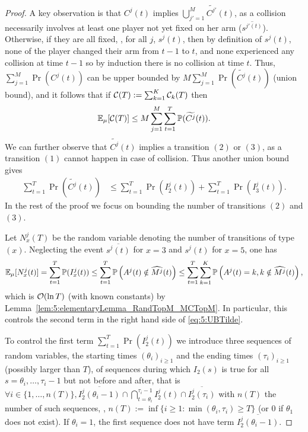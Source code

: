 \begin{proof}
  A key observation is that $C^j(t)$ implies $\bigcup_{j'=1}^M \widetilde{C^{j'}}(t)$, as a collision necessarily involves at least one player not yet fixed on her arm ($\overline{s^{j'(t)}}$).
  Otherwise, if they are all fixed, \ie, for all $j$, $s^j(t)$, then by definition of $s^j(t)$, none of the player changed their arm from $t-1$ to $t$, and none experienced any collision at time $t-1$ so by induction there is no collision at time $t$.
  Thus, $\sum_{j=1}^M \Pr(C^j(t))$ can be upper bounded by $M \sum_{j=1}^M \Pr(\widetilde{C^j}(t))$ (union bound),
  and it follows that if $\mathcal{C}(T) := \sum_{k=1}^K \mathcal{C}_k(T)$ then
  \[\mathbb{E}_{\mu}[\mathcal{C}(T)] \leq M \sum_{j=1}^M \sum_{t=1}^T \mathbb{P}(\widetilde{C^j}(t)).\]
  We can further  observe that $\widetilde{C^j}(t)$ implies a transition $(2)$ or $(3)$, as a transition $(1)$ cannot happen in case of collision. Thus another union bound gives
  \begin{align}
    \sum_{t=1}^T \Pr(\widetilde{C^j}(t))
    &\leq \sum_{t=1}^T \Pr(I_2^j(t))   + \sum_{t=1}^T \Pr(I_3^j(t)).\label{eq:5:UBTilde}
  \end{align}
  In the rest of the proof we focus on bounding the number of transitions $(2)$ and $(3)$.


  Let $N_x^j(T)$ be the random variable denoting the number of transitions of type $(x)$.
  Neglecting the event $\overline{s^j(t)}$ for $x=3$ and $s^j(t)$ for $x=5$, one has
  \begin{equation}
      \mathbb{E}_{\mu}[N_x^j(t)]
      = \sum_{t=1}^T \mathbb{P}(I_x^j(t))
      \leq \sum_{t=1}^T \mathbb{P} \left(A^j(t) \notin \widehat{M^j}(t)\right)
      \leq \sum_{t=1}^T \sum_{k=1}^K \mathbb{P} \left(A^j(t)=k, k \notin \widehat{M^j}(t)\right),
  \end{equation}
  which is $\mathop{}\mathopen{}\mathcal{O}\mathopen{}\left(\ln T\right)$ (with known constants) by Lemma~\ref{lem:5:elementaryLemma_RandTopM_MCTopM}. In particular, this controls the second term in the right hand side of \eqref{eq:5:UBTilde}.

  To control the first term $\sum_{t=1}^T \Pr(I_2^j(t))$
  we introduce three sequences of random variables,
  the starting times $(\theta_i)_{i \geq 1}$
  and the ending times $(\tau_i)_{i \geq 1}$
  (possibly larger than $T$),
  of sequences during which $I_2(s)$ is true for all $s=\theta_i,\dots,\tau_i-1$ but not before and after,
  that is
  $\forall i \in \{1,\dots,n(T)\},
  \overline{I_2^j(\theta_i - 1)}
  \cap \bigcap_{t=\theta_i}^{\tau_i-1} I_2^j(t)
  \cap \overline{I_2^j(\tau_i)}
  $
  with $n(T)$ the number of such sequences,
  \ie,
  $n(T) := \inf \{i \geq 1 : \min(\theta_i, \tau_i) \geq T \}$
  (or $0$ if $\theta_1$ does not exist).
  If $\theta_i = 1$, the first sequence does not have term $\overline{I_2^j(\theta_i - 1)}$.


\end{proof}
